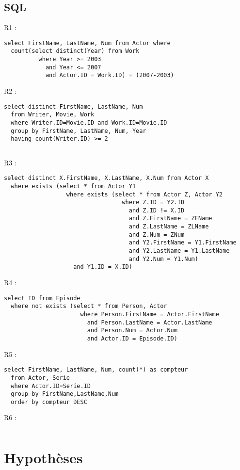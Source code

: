 \documentclass[a4paper,12pt]{article}
\begin{document}
\subsection{SQL}
\begin{list}{-}{}
  \item R1 :
    \begin{lstlisting}
select FirstName, LastName, Num from Actor where
  count(select distinct(Year) from Work
          where Year >= 2003 
            and Year <= 2007
            and Actor.ID = Work.ID) = (2007-2003)

    \end{lstlisting}
  \item R2 :
    \begin{lstlisting}
select distinct FirstName, LastName, Num
  from Writer, Movie, Work
  where Writer.ID=Movie.ID and Work.ID=Movie.ID
  group by FirstName, LastName, Num, Year
  having count(Writer.ID) >= 2
    
    \end{lstlisting}
  \item R3 :
    \begin{lstlisting}
select distinct X.FirstName, X.LastName, X.Num from Actor X
  where exists (select * from Actor Y1
                  where exists (select * from Actor Z, Actor Y2 
                                  where Z.ID = Y2.ID
                                    and Z.ID != X.ID
                                    and Z.FirstName = ZFName
                                    and Z.LastName = ZLName
                                    and Z.Num = ZNum
                                    and Y2.FirstName = Y1.FirstName
                                    and Y2.LastName = Y1.LastName
                                    and Y2.Num = Y1.Num)
                    and Y1.ID = X.ID)
    \end{lstlisting}
  \item R4 :
    \begin{lstlisting}
select ID from Episode
  where not exists (select * from Person, Actor
                      where Person.FirstName = Actor.FirstName
                        and Person.LastName = Actor.LastName
                        and Person.Num = Actor.Num
                        and Actor.ID = Episode.ID)
    \end{lstlisting}
  \item R5 :
    \begin{lstlisting}
select FirstName, LastName, Num, count(*) as compteur
  from Actor, Serie
  where Actor.ID=Serie.ID
  group by FirstName,LastName,Num
  order by compteur DESC
    \end{lstlisting}
  \item R6 :
    \begin{lstlisting}
    \end{lstlisting}
\section{Hypothèses}
\end{list}
\end{document}
